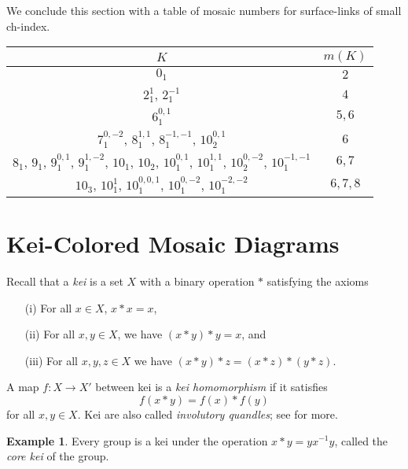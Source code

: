 \documentclass{article}
\def\tr{\ast}
\theoremstyle{definition}
\newtheorem{example}{Example}
\begin{document}

We conclude this section with a table of mosaic numbers for surface-links
of small ch-index.

\begin{center}
  \begin{tabular}[ ]{| c | c | }
    \hline 
    $K$ & $m(K)$   \\ 
    \hline \hline
    $0_{1}$                                     & $2$  \\ \hline 
    $2_{1}^{1}$, $2_{1}^{-1}$         & $4$ \\ \hline
    $6_{1}^{0,1}$                           & $5, 6$ \\ \hline 
    $7_{1}^{0,-2}$, $8_{1}^{1,1}$, $8_{1}^{-1,-1}$, $10_{2}^{0,1}$ & $6$ \\ \hline
    $8_{1}$, $9_{1}$, $9_{1}^{0,1}$, $9_{1}^{1,-2}$, $10_{1}$, $10_{2}$,  $10_{1}^{0,1}$, $10_{1}^{1,1}$, $10_{2}^{0,-2}$, $10_{1}^{-1,-1}$ & $6, 7$ \\ \hline
    $10_{3}$, $10_{1}^{1}$,  $10_{1}^{0,0,1}$, $10_{1}^{0,-2}$, $10_{1}^{-2,-2}$ & $6, 7, 8$\\ \hline
  \end{tabular}
\end{center}

\section{\large\textbf{Kei-Colored Mosaic Diagrams}}\label{K}


Recall that a \textit{kei} is a set $X$ with a binary operation $\tr$
satisfying the axioms
\begin{itemize}
\item[(i)] For all $x\in X$, $x\tr x=x$,
\item[(ii)] For all $x,y\in X$, we have $(x\tr y)\tr y=x$, and 
\item[(iii)] For all $x,y,z\in X$ we have $(x\tr y)\tr z=(x\tr z)\tr (y\tr z)$.
\end{itemize}
A map $f:X\to X'$ between kei is a \textit{kei homomorphism} if it satisfies
\[f(x\tr y)=f(x)\tr f(y)\]
for all $x,y\in X$. Kei are also called \textit{involutory quandles}; see 
\cite{EN} for more.

\begin{example}
Every group is a kei under the operation $x\ast y=yx^{-1}y$, called the 
\textit{core kei} of the group.
\end{example}
\end{document}
